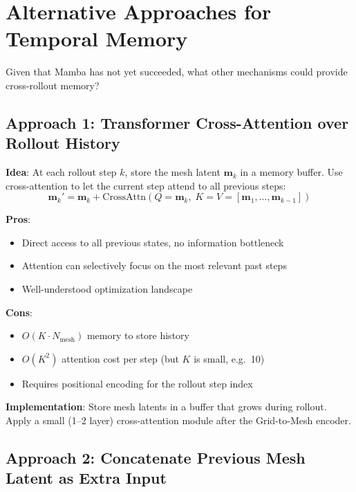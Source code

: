 \documentclass[11pt,a4paper]{article}
\begin{document}
\section{Alternative Approaches for Temporal Memory}

Given that Mamba has not yet succeeded, what other mechanisms could provide cross-rollout memory?

\subsection{Approach 1: Transformer Cross-Attention over Rollout History}

\textbf{Idea}: At each rollout step $k$, store the mesh latent $\mathbf{m}_k$ in a memory buffer. Use cross-attention to let the current step attend to all previous steps:
\[
\mathbf{m}_k' = \mathbf{m}_k + \text{CrossAttn}(Q{=}\mathbf{m}_k, \; K{=}V{=}[\mathbf{m}_1, \ldots, \mathbf{m}_{k-1}])
\]

\textbf{Pros}:
\begin{itemize}[nosep]
  \item Direct access to all previous states, no information bottleneck
  \item Attention can selectively focus on the most relevant past steps
  \item Well-understood optimization landscape
\end{itemize}

\textbf{Cons}:
\begin{itemize}[nosep]
  \item $O(K \cdot N_\text{mesh})$ memory to store history
  \item $O(K^2)$ attention cost per step (but $K$ is small, e.g.\ 10)
  \item Requires positional encoding for the rollout step index
\end{itemize}

\textbf{Implementation}: Store mesh latents in a buffer that grows during rollout. Apply a small (1--2 layer) cross-attention module after the Grid-to-Mesh encoder.

\subsection{Approach 2: Concatenate Previous Mesh Latent as Extra Input}
\end{document}
